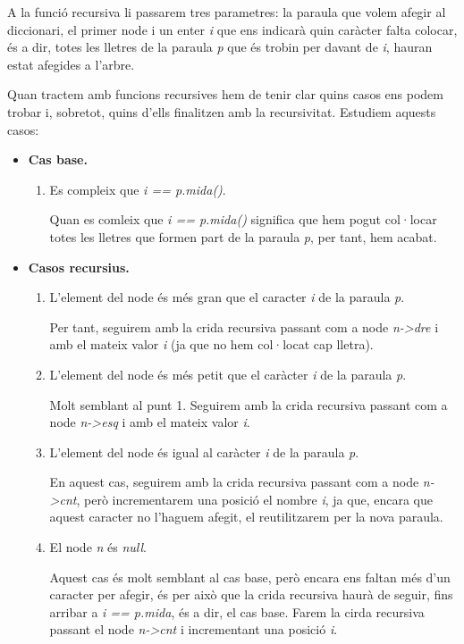 \documentclass[titlepage]{article}
\begin{document}
A la funció recursiva li passarem tres parametres: la paraula que volem afegir al diccionari, el primer node i un enter \textit{i} que ens indicarà quin caràcter falta colocar, és a dir, totes les lletres de la paraula \textit{p} que és trobin per davant de \textit{i}, hauran estat afegides a l'arbre.
\newline\par
Quan tractem amb funcions recursives hem de tenir clar quins casos ens podem trobar i, sobretot, quins d'ells finalitzen amb la recursivitat. Estudiem aquests casos:

\begin{itemize}
    \item \textbf{Cas base.} 
    \begin{enumerate}
        \item Es compleix que \textit{i == p.mida()}. \par
    Quan es comleix que \textit{i == p.mida()} significa que hem pogut col·locar totes les lletres que formen part de la paraula \textit{p}, per tant, hem acabat.
    \newline\par
    \end{enumerate}

    \item \textbf{Casos recursius.} 
    \begin{enumerate}
        \item L'element del node és més gran que el caracter \textit{i} de la paraula \textit{p}. \par
        Per tant, seguirem amb la crida recursiva passant com a node \textit{n->dre} i amb el mateix valor \textit{i} (ja que no hem col·locat cap lletra).
        \item L'element del node és més petit que el caràcter \textit{i} de la paraula \textit{p}. \par
        Molt semblant al punt 1. Seguirem amb la crida recursiva passant com a node \textit{n->esq} i amb el mateix valor \textit{i}.
        \item L'element del node és igual al caràcter \textit{i} de la paraula \textit{p}. \par
        En aquest cas, seguirem amb la crida recursiva passant com a node \textit{n->cnt}, però incrementarem una posició el nombre \textit{i}, ja que, encara que aquest caracter no l'haguem afegit, el reutilitzarem per la nova paraula.
        \item El node \textit{n} és \textit{null}. \par
        Aquest cas és molt semblant al cas base, però encara ens faltan més d'un caracter per afegir, és per això que la crida recursiva haurà de seguir, fins arribar a \textit{i == p.mida}, és a dir, el cas base. Farem la cirda recursiva passant el node \textit{n->cnt} i incrementant una posició \textit{i}.
    \end{enumerate}
\end{itemize}
\end{document}
